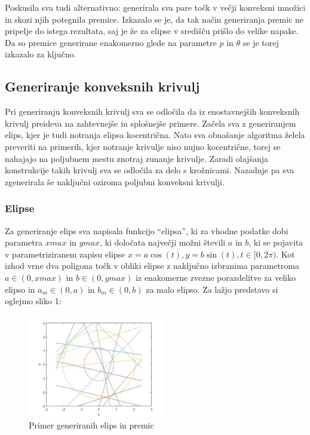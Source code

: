 \documentclass[a4paper]{article}
\begin{document}
Poskusila sva tudi alternativno: generirala sva pare točk v večji konveksni množici in skozi njih potegnila premice. Izkazalo se je, da tak način generiranja premic ne pripelje do istega rezultata, saj je že za elipse v središču prišlo do velike napake. Da so premice generirane enakomerno glede na parametre $p$ in $\theta$ se je torej izkazalo za ključno.

\subsection{Generiranje konveksnih krivulj}
Pri generiranju konveksnih krivulj sva se odločila da iz enostavnejših konveksnih krivulj preideva na zahtevnejše in splošnejše primere. Začela sva z generiranjem elips, kjer je tudi notranja elipsa kocentrična. Nato sva obnašanje algoritma želela preveriti na primerih, kjer notranje krivulje niso nujno kocentrične, torej se nahajajo na poljubnem mestu znotraj zunanje krivulje. Zaradi olajšanja konstrukcije takih krivulj sva se odločila za delo s krožnicami. Nazadnje pa sva zgenerirala še naključni oziroma poljubni konveksni krivulji. 

\subsubsection{Elipse}
Za generiranje elips sva napisala funkcijo ``elipsa'', ki za vhodne podatke dobi parametra $xmax$ in $ymax$, ki določata največji možni števili $a$ in $b$, ki se pojavita v parametriziranem zapisu elipse $x=a \cos(t), y=b \sin(t), t\in [0, 2\pi)$. Kot izhod vrne dva poligona točk v obliki elipse z naključno izbranima parametroma $a \in (0, xmax)$ in $b \in (0, ymax)$ iz enakomerne zvezne porazdelitve za veliko elipso in $a_m \in (0, a)$ in $b_m \in (0, b)$ za malo elipso. Za lažjo predstavo si oglejmo sliko 1:

\begin{figure}[h]
\centering
\includegraphics[width=60mm]{graf_primer.jpg}
\caption{Primer generiranih elips in premic \label{overflow}}
\end{figure} 
\end{document}
